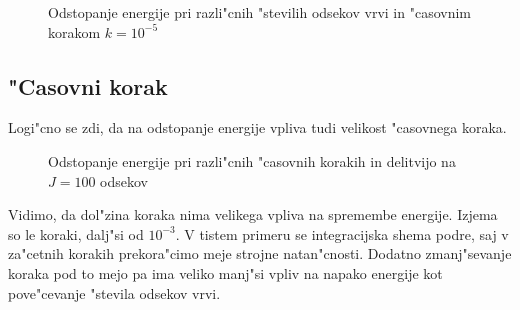 \documentclass[a4paper,10pt]{article}
\begin{document}
\begin{figure}[H]
 
 \caption{Odstopanje energije pri razli"cnih "stevilih odsekov vrvi in "casovnim korakom $k = 10^{-5}$}
 \label{fig:energija-odseki-log}
\end{figure}

\subsection{"Casovni korak}
\label{sec:casovni-korak}

Logi"cno se zdi, da na odstopanje energije vpliva tudi velikost "casovnega koraka. 

\begin{figure}[H]
 
 \caption{Odstopanje energije pri razli"cnih "casovnih korakih in delitvijo na $J=100$ odsekov}
 \label{fig:energija-korak}
\end{figure}

Vidimo, da dol"zina koraka nima velikega vpliva na spremembe energije. Izjema so le koraki, dalj"si od $10^{-3}$. V tistem primeru se integracijska shema podre, saj v za"cetnih korakih prekora"cimo meje strojne natan"cnosti. Dodatno zmanj"sevanje koraka pod to mejo pa ima veliko manj"si vpliv na napako energije kot pove"cevanje "stevila odsekov vrvi. 
\end{document}
